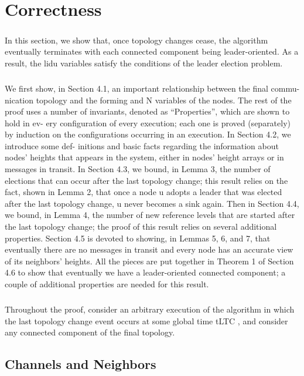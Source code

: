 \chapter{Correctness}
\paragraph{}In this section, we show that, once topology changes cease, the algorithm eventually terminates with each connected component being leader-oriented. As a result, the lidu variables satisfy the conditions of the leader election problem.
\paragraph{}We first show, in Section 4.1, an important relationship between the final commu- nication topology and the forming and N variables of the nodes. The rest of the proof uses a number of invariants, denoted as “Properties”, which are shown to hold in ev- ery configuration of every execution; each one is proved (separately) by induction on the configurations occurring in an execution. In Section 4.2, we introduce some def- initions and basic facts regarding the information about nodes’ heights that appears in the system, either in nodes’ height arrays or in messages in transit. In Section 4.3, we bound, in Lemma 3, the number of elections that can occur after the last topology change; this result relies on the fact, shown in Lemma 2, that once a node u adopts a leader that was elected after the last topology change, u never becomes a sink again. Then in Section 4.4, we bound, in Lemma 4, the number of new reference levels that are started after the last topology change; the proof of this result relies on several additional properties. Section 4.5 is devoted to showing, in Lemmas 5, 6, and 7, that eventually there are no messages in transit and every node has an accurate view of its neighbors’ heights. All the pieces are put together in Theorem 1 of Section 4.6 to show that eventually we have a leader-oriented connected component; a couple of additional properties are needed for this result.
\paragraph{}Throughout the proof, consider an arbitrary execution of the algorithm in which the last topology change event occurs at some global time tLTC , and consider any connected component of the final topology.
\section{Channels and Neighbors}
